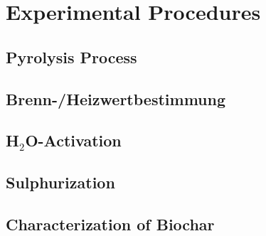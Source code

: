 \newpage
\section{Experimental Procedures}
\subsection{Pyrolysis Process}
\subsection{Brenn-/Heizwertbestimmung}
\subsection{\texorpdfstring{H$_2$O}{H2O}-Activation}
\subsection{Sulphurization}
\subsection{Characterization of Biochar}
